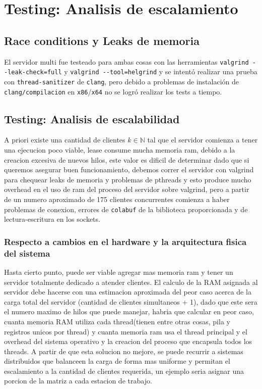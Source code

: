 \section{Testing: Analisis de escalamiento}
\subsection{Race conditions y Leaks de memoria}
El servidor multi fue testeado para ambas cosas con las herramientas \verb|valgrind --leak-check=full| y \verb|valgrind --tool=helgrind| y se intent\'o realizar una prueba con \verb|thread-sanitizer| de \verb|clang|, pero debido a problemas de instalaci\'on de \verb|clang/compilacion| en \verb|x86|/\verb|x64| no se logr\'o realizar los tests a tiempo.

\subsection{Testing: Analisis de escalabilidad}
A priori existe una cantidad de clientes $k \in \mathbb{N}$ tal que el servidor comienza a tener una ejecucion poco viable, lease consume mucha memoria ram, debido a la creacion excesiva de nuevos hilos, este valor es dificil de determinar dado que si queremos asegurar buen funcionamiento, debemos correr el servidor con valgrind para chequear leaks de memoria y problemas de pthreads y esto produce mucho overhead en el uso de ram del proceso del servidor sobre valgrind, pero a partir de un numero aproximado de 175 clientes concurrentes comienza a haber problemas de conexion, errores de \verb|colabuf| de la biblioteca proporcionada y de lectura-escritura en los sockets. 

\subsubsection{Respecto a cambios en el hardware y la arquitectura fisica del sistema}
Hasta cierto punto, puede ser viable agregar mas memoria ram y tener un servidor totalmente dedicado a atender clientes. El calculo de la RAM asignada al servidor debe hacerse con una estimacion aproximada del peor caso acerca de la carga total del servidor (cantidad de clientes simultaneos + 1), dado que este sera el numero maximo de hilos que puede manejar, habria que calcular en peor caso, cuanta memoria RAM utiliza cada thread(tienen entre otras cosas, pila y registros unicos por thread) y cuanta memoria ram usa el thread principal y el overhead del sistema operativo y la creacion del proceso que encapsula todos los threads.
A partir de que esta solucion no mejore, se puede recurrir a sistemas distribuidos que balanceen la carga de forma mas uniforme y permitan el escalamiento a la cantidad de clientes requerida, un ejemplo seria asignar una porcion de la matriz a cada estacion de trabajo.

